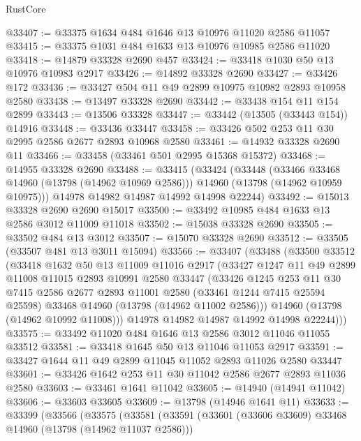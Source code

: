 \begin{lexlean}{RustCore}
\begin{coremodule}
@33407 := @33375 @1634 @484 @1646 @13 @10976 @11020 @2586 @11057
@33415 := @33375 @1031 @484 @1633 @13 @10976 @10985 @2586 @11020
@33418 := @14879 @33328 @2690 @457
@33424 := @33418 @1030 @50 @13 @10976 @10983 @2917
@33426 := @14892 @33328 @2690
@33427 := @33426 @172
@33436 := @33427 @504 @11 @49 @2899 @10975 @10982 @2893 @10958 @2580
@33438 := @13497 @33328 @2690
@33442 := @33438 @154 @11 @154 @2899
@33443 := @13506 @33328
@33447 := @33442 (@13505 (@33443 @154)) @14916
@33448 := @33436 @33447
@33458 := @33426 @502 @253 @11 @30 @2995 @2586 @2677 @2893 @10968 @2580
@33461 := @14932 @33328 @2690 @11
@33466 := @33458 (@33461 @501 @2995 @15368 @15372)
@33468 := @14955 @33328 @2690
@33488 := @33415
    (@33424
      (@33448
        (@33466 @33468 @14960 (@13798 (@14962 @10969 @2586)))
        @14960
        (@13798 (@14962 @10959 @10975)))
      @14978
      @14982
      @14987
      @14992
      @14998
      @22244)
@33492 := @15013 @33328 @2690 @2690 @15017
@33500 := @33492 @10985 @484 @1633 @13 @2586 @3012 @11009 @11018
@33502 := @15038 @33328 @2690
@33505 := @33502 @484 @13 @3012
@33507 := @15070 @33328 @2690
@33512 := @33505 (@33507 @481 @13 @3011 @15094)
@33566 := @33407
    (@33488
      (@33500
        @33512
        (@33418
          @1632
          @50
          @13
          @11009
          @11016
          @2917
          (@33427
            @1247
            @11
            @49
            @2899
            @11008
            @11015
            @2893
            @10991
            @2580
            @33447
            (@33426
              @1245
              @253
              @11
              @30
              @7415
              @2586
              @2677
              @2893
              @11001
              @2580
              (@33461 @1244 @7415 @25594 @25598)
              @33468
              @14960
              (@13798 (@14962 @11002 @2586)))
            @14960
            (@13798 (@14962 @10992 @11008)))
          @14978
          @14982
          @14987
          @14992
          @14998
          @22244)))
@33575 := @33492 @11020 @484 @1646 @13 @2586 @3012 @11046 @11055 @33512
@33581 := @33418 @1645 @50 @13 @11046 @11053 @2917
@33591 := @33427 @1644 @11 @49 @2899 @11045 @11052 @2893 @11026 @2580 @33447
@33601 := @33426 @1642 @253 @11 @30 @11042 @2586 @2677 @2893 @11036 @2580
@33603 := @33461 @1641 @11042
@33605 := @14940 (@14941 @11042)
@33606 := @33603 @33605
@33609 := @13798 (@14946 @1641 @11)
@33633 := @33399
    (@33566
      (@33575
        (@33581
          (@33591
            (@33601 (@33606 @33609) @33468 @14960 (@13798 (@14962 @11037 @2586)))

\end{coremodule}
\end{lexlean}
